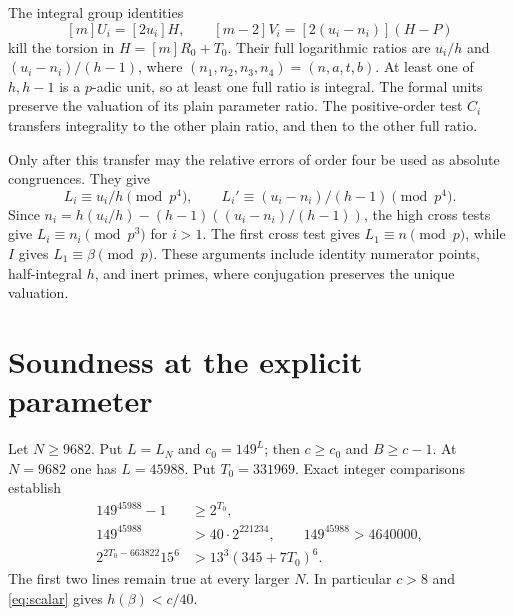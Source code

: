 \documentclass[11pt,a4paper]{article}
\begin{document}
The integral group identities
\[
                  [m]U_i=[2u_i]H,\qquad
                  [m-2]V_i=[2(u_i-n_i)](H-P)
\]
kill the torsion in $H=[m]R_0+T_0$. Their full logarithmic ratios
are $u_i/h$ and $(u_i-n_i)/(h-1)$, where
$(n_1,n_2,n_3,n_4)=(n,a,t,b)$. At least one of $h,h-1$ is a
$p$-adic unit, so at least one full ratio is integral. The formal
units preserve the valuation of its plain parameter ratio.
The positive-order test $C_i$ transfers integrality to the other
plain ratio, and then to the other full ratio.

Only after this transfer may the relative errors of order four
be used as absolute congruences. They give
\[
 L_i\equiv u_i/h\pmod{p^4},\qquad
 L_i'\equiv(u_i-n_i)/(h-1)\pmod{p^4}.
\]
Since $n_i=h(u_i/h)-(h-1)((u_i-n_i)/(h-1))$, the high cross tests
give $L_i\equiv n_i\pmod{p^3}$ for $i>1$. The first cross test
gives $L_1\equiv n\pmod p$, while $I$ gives $L_1\equiv\beta\pmod p$.
These arguments include identity numerator points, half-integral $h$,
and inert primes, where conjugation preserves the unique valuation.

\section{Soundness at the explicit parameter}\label{sec:soundness}
Let $N\ge9682$. Put $L=L_N$ and $c_0=149^L$; then $c\ge c_0$ and
$B\ge c-1$. At $N=9682$ one has $L=45988$. Put $T_0=331969$.
Exact integer comparisons establish
\begin{equation}\label{eq:thresholds}
 \begin{split}
 149^{45988}-1&\ge2^{T_0},\\
 149^{45988}&>40\cdot2^{221234},\qquad149^{45988}>4640000,\\
 2^{2T_0-663822}15^6&>13^3(345+7T_0)^6.
 \end{split}
\end{equation}
The first two lines remain true at every larger $N$.
In particular $c>8$ and \eqref{eq:scalar} gives $h(\beta)<c/40$.
\end{document}
